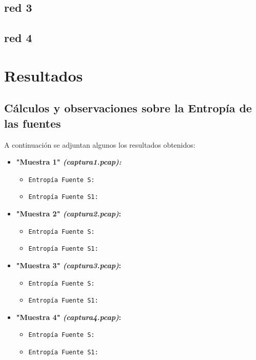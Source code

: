 \documentclass[final,inline,narroweqnarray,a4paper]{ieee}
\begin{document}
\subsection{red 3}
\subsection{red 4}

\section{Resultados}

\subsection{Cálculos y observaciones sobre la Entropía de las fuentes}

A continuación se adjuntan algunos los resultados obtenidos:
	
	
	\begin{itemize}
 	 \item \textbf{"Muestra 1" \emph{(captura1.pcap):}}
			\begin{itemize}
				\item \texttt{Entropía Fuente S: }				
				\item \texttt{Entropía Fuente S{\scriptsize 1}: }
			\end{itemize}

 	 \item \textbf{"Muestra 2" \emph{(captura2.pcap)}:}
		   \begin{itemize}
				\item \texttt{Entropía Fuente S: }				
				\item \texttt{Entropía Fuente S{\scriptsize 1}: }
		   \end{itemize}
		   
 	 \item \textbf{"Muestra 3" \emph{(captura3.pcap)}:}
		 	 \begin{itemize}
		 	 	\item \texttt{Entropía Fuente S: }				
		 	 	\item \texttt{Entropía Fuente S{\scriptsize 1}: }
		 	 \end{itemize}
		   
	 \item \textbf{"Muestra 4" \emph{(captura4.pcap)}:}
		   \begin{itemize}
		   	\item \texttt{Entropía Fuente S: }				
		   	\item \texttt{Entropía Fuente S{\scriptsize 1}: }
		   \end{itemize}
		   		   		 	 		   
	\end{itemize}
\end{document}
